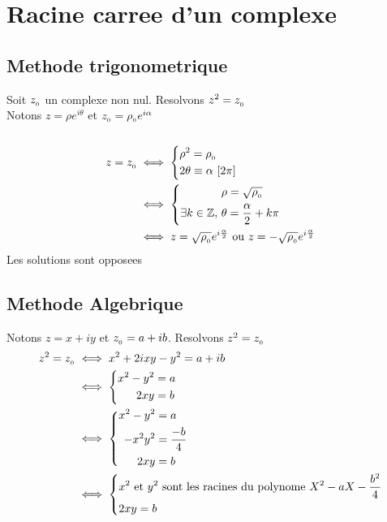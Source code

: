 \documentclass[12pt,a4paper]{article}
\author{MPSI 2}
\begin{document}
	\maketitle
	
	\section{Racine carree d'un complexe}
		\subsection{Methode trigonometrique}
			Soit $z_{_{0}}$ un complexe non nul. Resolvons $z^2 = z_{_{0}}$ \\
			Notons $z=\rho e^{i\theta}$ et $z_{_{0}}=\rho_{_{0}}e^{i\alpha}$ \\ \\
			$$\begin{aligned}
				z=z\uu0&\iff\left\{\begin{aligned}				
					&\rho^2=\rho\uu0 \\
					&2\theta\equiv\alpha\ [2\pi]\end{aligned}\right. \\
				&\iff\left\{\begin{aligned}
					&\rho=\sqrt{\rho\uu0} \\
					\exists k\in\mathbb{Z},\ &\theta=\frac{\alpha}{2}+k\pi
					\end{aligned}\right. \\
				&\iff z=\sqrt{\rho\uu0}e^{i\frac{\alpha}{2}}\text{ ou }z=-\sqrt{\rho\uu0}e^{i\frac{\alpha}{2}}
			\end{aligned}$$
			Les solutions sont opposees \\
		\subsection{Methode Algebrique}
			Notons $z=x+iy$ et $z_{_{0}}=a+ib$. Resolvons $z^2=z_{_{0}}$ \\
			$$\begin{aligned}
				z^2=z_{_{0}} &\iff x^2+2ixy-y^2=a+ib \\
				&\iff \left\{\begin{aligned}
					x^2-y^2&=a \\
					2xy&=b
				\end{aligned}\right. \\
				&\iff \left\{\begin{aligned}
					x^2-y^2&=a \\
					-x^2y^2&=\frac{-b}{4} \\
					2xy&=b
				\end{aligned}\right. \\
				&\iff \left\{\begin{aligned}
					&x^2\text{ et }y^2\text{ sont les racines du polynome }X^2-aX-\frac{b^2}{4} \\
					&2xy=b
				\end{aligned}\right.
			\end{aligned}$$ \\
\end{document}
